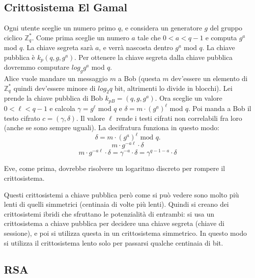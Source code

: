 \subsection*{Crittosistema El Gamal}

Ogni utente sceglie un numero primo $q$, e considera un generatore $g$ del gruppo ciclico $\mathbb{Z}_q^*$.
Come prima sceglie un numero $a$ tale che $0 < a < q-1$ e computa $g^a$ mod $q$. La chiave segreta sarà $a$, e verrà nascosta dentro $g^a$ mod $q$. La chiave pubblica è $k_p(q, g, g^a)$. Per ottenere la chiave segreta dalla chiave pubblica dovremmo computare $log_gg^a$ mod $q$.\\


Alice vuole mandare un messaggio $m$ a Bob (questa $m$ dev'essere un elemento di $\mathbb{Z}_q^*$ quindi dev'essere minore di $log_2q$ bit, altrimenti lo divide in blocchi).
Lei prende la chiave pubblica di Bob $k_{pB} = (q, g, g^a)$. Ora sceglie un valore $0 < \ell < q-1$ e calcola $\gamma = g^{\ell}$ mod $q$ e $\delta = m \cdot (g^a)^{\ell}$ mod $q$.
Poi manda a Bob il testo cifrato $c=(\gamma, \delta)$.
Il valore $\ell$ rende i testi cifrati non correlabili fra loro (anche se sono sempre uguali).
La decifratura funziona in questo modo:
\begin{equation*}
\delta = m \cdot (g^a)^{\ell} \text{ mod } q.
\end{equation*}
\begin{equation*}
m \cdot g^{-a\ell} \cdot \delta
\end{equation*}
\begin{equation*}
	m \cdot g^{-a\ell} \cdot \delta = \gamma^{-a} \cdot \delta = \gamma^{q-1-a} \cdot \delta
\end{equation*}

Eve, come prima, dovrebbe risolvere un logaritmo discreto per rompere il crittosistema.

Questi crittosistemi a chiave pubblica però come si può vedere sono molto più lenti di quelli simmetrici (centinaia di volte più lenti).
Quindi si creano dei crittosistemi ibridi che sfruttano le potenzialità di entrambi: si usa un crittosistema a chiave pubblica per decidere una chiave segreta (chiave di sessione), e poi si utilizza questa in un crittosistema simmetrico. In questo modo si utilizza il crittosistema lento solo per passarsi qualche centinaia di bit.

\subsection*{RSA}

